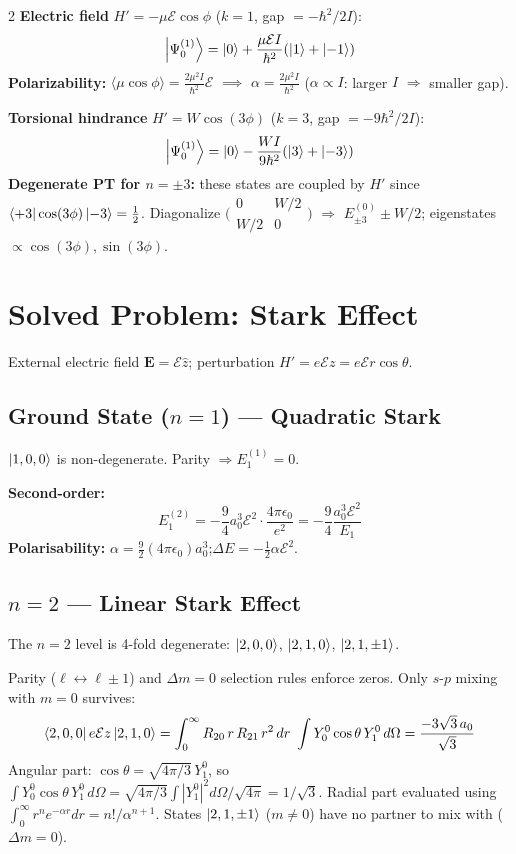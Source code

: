 \documentclass[9pt,a4paper]{article} %
\begin{document}
\begin{multicols}{2}
\textbf{Electric field} $H'=-\mu\mathcal{E}\cos\phi$ ($k=1$, gap $= -\hbar^2/2I$):
\[
\ket{\Psi_0^{(1)}}=\ket{0}+\frac{\mu\mathcal{E}I}{\hbar^2}(\ket{1}+\ket{-1})
\]
\textbf{Polarizability:} $\langle\mu\cos\phi\rangle = \frac{2\mu^2 I}{\hbar^2}\mathcal{E}$ $\implies$ $\boxed{\alpha=\frac{2\mu^2 I}{\hbar^2}}$ ($\alpha\propto I$: larger $I$ $\Rightarrow$ smaller gap).

\textbf{Torsional hindrance} $H'=W\cos(3\phi)$ ($k=3$, gap $= -9\hbar^2/2I$):
\[
\ket{\Psi_0^{(1)}}=\ket{0}-\frac{WI}{9\hbar^2}(\ket{3}+\ket{-3})
\]
{\footnotesize\textbf{Degenerate PT for $n=\pm3$:} these states are coupled by $H'$ since $\bra{+3}\cos(3\phi)\ket{-3}=\tfrac{1}{2}$. Diagonalize $\bigl(\begin{smallmatrix}0&W/2\\W/2&0\end{smallmatrix}\bigr)$ $\Rightarrow$ $E_{\pm3}^{(0)}\pm W/2$; eigenstates $\propto\cos(3\phi),\sin(3\phi)$.}
\section{Solved Problem: Stark Effect}

External electric field $\mathbf{E} = \mathcal{E}\hat{z}$; perturbation $H' = e\mathcal{E}z = e\mathcal{E}r\cos\theta$.

\subsection{Ground State ($n=1$) — Quadratic Stark}
$\ket{1,0,0}$ is non-degenerate. Parity $\Rightarrow E^{(1)}_1 = 0$.

\textbf{Second-order:}
\[
\boxed{E_1^{(2)} = -\frac{9}{4}a_0^3 \mathcal{E}^2 \cdot \frac{4\pi\epsilon_0}{e^2} = -\frac{9}{4}\frac{a_0^3 \mathcal{E}^2}{E_1}}
\]
\textbf{Polarisability:} $\alpha = \frac{9}{2}(4\pi\epsilon_0)a_0^3$;\quad $\Delta E = -\frac{1}{2}\alpha\mathcal{E}^2$.

\subsection{$n=2$ — Linear Stark Effect}
The $n=2$ level is 4-fold degenerate: $\ket{2,0,0}$, $\ket{2,1,0}$, $\ket{2,1,\pm 1}$.

Parity ($\ell \leftrightarrow \ell \pm 1$) and $\Delta m = 0$ selection rules enforce zeros.
Only $s$-$p$ mixing with $m=0$ survives:
\[
  \bra{2,0,0}e\mathcal{E}z\ket{2,1,0}
  = \int_0^\infty R_{20}\,r\,R_{21}\,r^2\,dr\
    \int Y_0^0\cos\theta\,Y_1^0\,d\Omega = \frac{-3\sqrt{3}\,a_0}{\sqrt{3}}
\]
{\footnotesize Angular part: $\cos\theta = \sqrt{4\pi/3}\,Y_1^0$,
so $\int Y_0^0\cos\theta\, Y_1^0\,d\Omega = \sqrt{4\pi/3}\int|Y_1^0|^2 d\Omega/\sqrt{4\pi} = 1/\sqrt{3}$.
Radial part evaluated using $\int_0^\infty r^n e^{-\alpha r}dr = n!/\alpha^{n+1}$.}
States $\ket{2,1,\pm 1}$ ($m \ne 0$) have no partner to mix with ($\Delta m=0$).


\end{multicols}
\end{document}
